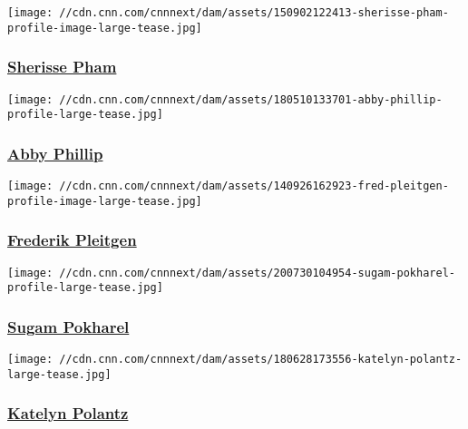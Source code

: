 \href{/profiles/sherisse-pham-profile}{}

\texttt{[image: //cdn.cnn.com/cnnnext/dam/assets/150902122413-sherisse-pham-profile-image-large-tease.jpg]}

\hypertarget{sherisse-pham}{%
\subsubsection{\texorpdfstring{\href{/profiles/sherisse-pham-profile}{Sherisse
Pham}}{Sherisse Pham}}\label{sherisse-pham}}

\href{/profiles/abby-phillip-profile}{}

\texttt{[image: //cdn.cnn.com/cnnnext/dam/assets/180510133701-abby-phillip-profile-large-tease.jpg]}

\hypertarget{abby-phillip}{%
\subsubsection{\texorpdfstring{\href{/profiles/abby-phillip-profile}{Abby
Phillip}}{Abby Phillip}}\label{abby-phillip}}

\href{/profiles/frederik-pleitgen}{}

\texttt{[image: //cdn.cnn.com/cnnnext/dam/assets/140926162923-fred-pleitgen-profile-image-large-tease.jpg]}

\hypertarget{frederik-pleitgen}{%
\subsubsection{\texorpdfstring{\href{/profiles/frederik-pleitgen}{Frederik
Pleitgen}}{Frederik Pleitgen}}\label{frederik-pleitgen}}

\href{/profiles/sugam-pokharel}{}

\texttt{[image: //cdn.cnn.com/cnnnext/dam/assets/200730104954-sugam-pokharel-profile-large-tease.jpg]}

\hypertarget{sugam-pokharel}{%
\subsubsection{\texorpdfstring{\href{/profiles/sugam-pokharel}{Sugam
Pokharel}}{Sugam Pokharel}}\label{sugam-pokharel}}

\href{/profiles/katelyn-polantz-profile}{}

\texttt{[image: //cdn.cnn.com/cnnnext/dam/assets/180628173556-katelyn-polantz-large-tease.jpg]}

\hypertarget{katelyn-polantz}{%
\subsubsection{\texorpdfstring{\href{/profiles/katelyn-polantz-profile}{Katelyn
Polantz}}{Katelyn Polantz}}\label{katelyn-polantz}}

